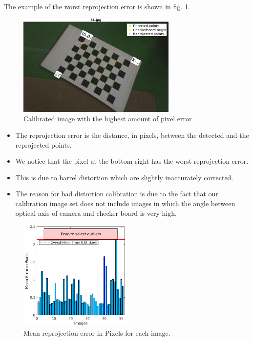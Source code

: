 The example of the worst reprojection error is shown in fig. \ref{fig:worst-calibrated-image}.
\begin{figure}[H]
\begin{center}
\includegraphics[width=0.7\textwidth]{graphics/worst.png}
\caption{Calibrated image with the highest amount of pixel error}
\label{fig:worst-calibrated-image}
\end{center}
\end{figure}
\begin{itemize}
\item The reprojection error is the distance, in pixels, between the detected and the reprojected points.
\item We notice that the pixel at the bottom-right has the worst reprojection error.
\item This is due to barrel distortion which are slightly inaccurately corrected.
\item The reason for bad distortion calibration is due to the fact that our calibration image set does not include images in which the angle between optical axis of camera and checker board is very high.
\end{itemize}

\begin{figure}[H]
\begin{center}
\includegraphics[width=0.5\textwidth]{graphics/stats.png}
\caption{Mean reprojection error in Pixels for each image.}
\label{fig:stats}
\end{center}
\end{figure}


